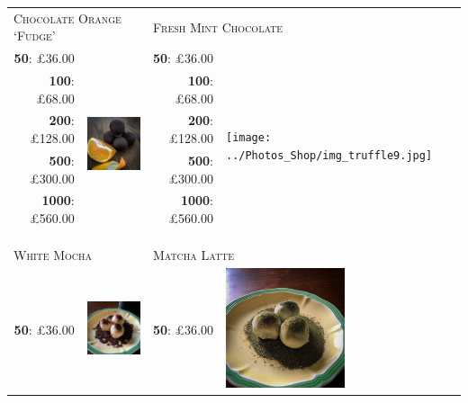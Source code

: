 \documentclass[11pt, english]{article}
\begin{document}
	\begin{table}[h]
	\begin{center}
	\begin{tabular}{r|p{4cm}r|p{4cm}}
		\multicolumn{2}{l}{\textsc{Chocolate Orange `Fudge'}} & \multicolumn{2}{l}{\textsc{Fresh Mint Chocolate}}\\
		\textbf{50}: \pounds36.00 & \multirow{8}{*}{\includegraphics[width=3.5cm,height=3.5cm]{../Photos_Shop/img_truffle8.jpg}} & \textbf{50}: \pounds36.00 & \multirow{8}{*}{\texttt{[image: ../Photos\_Shop/img\_truffle9.jpg]}}\\
		\textbf{100}: \pounds68.00 & & \textbf{100}: \pounds68.00 & \\
		\textbf{200}: \pounds128.00 & & \textbf{200}: \pounds128.00 & \\
		\textbf{500}: \pounds300.00 & & \textbf{500}: \pounds300.00 & \\
		\textbf{1000}: \pounds560.00 & & \textbf{1000}: \pounds560.00 & \\
		\multicolumn{4}{l}{}\\
		\multicolumn{4}{l}{}\\
		\multicolumn{4}{l}{}\\
		\multicolumn{2}{l}{\textsc{White Mocha}} & \multicolumn{2}{l}{\textsc{Matcha Latte}}\\
		\textbf{50}: \pounds36.00 & \multirow{5}{*}{\includegraphics[width=3.5cm,height=3.5cm]{../Photos_Shop/img_truffle3.jpg}} & \textbf{50}: \pounds36.00 & \multirow{5}{*}{\includegraphics[width=3.5cm,height=3.5cm]{../Photos_Shop/img_truffle10.jpg}}\\

\end{tabular}
\end{center}
\end{table}
\end{document}
